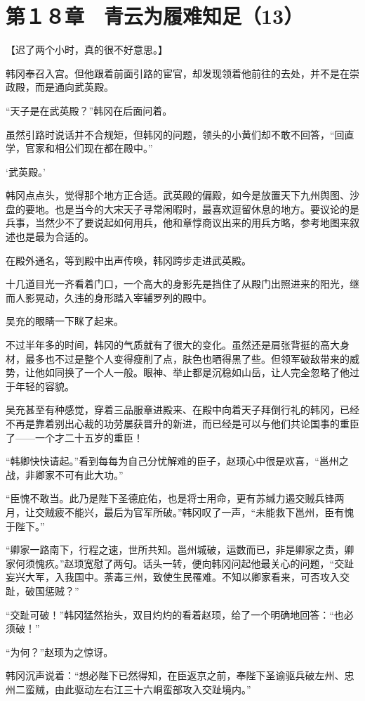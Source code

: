 \section{第１８章　青云为履难知足（13）}

【迟了两个小时，真的很不好意思。】

韩冈奉召入宫。但他跟着前面引路的宦官，却发现领着他前往的去处，并不是在崇政殿，而是通向武英殿。

“天子是在武英殿？”韩冈在后面问着。

虽然引路时说话并不合规矩，但韩冈的问题，领头的小黄们却不敢不回答，“回直学，官家和相公们现在都在殿中。”

‘武英殿。’

韩冈点点头，觉得那个地方正合适。武英殿的偏殿，如今是放置天下九州舆图、沙盘的要地。也是当今的大宋天子寻常闲暇时，最喜欢逗留休息的地方。要议论的是兵事，当然少不了要说起如何用兵，他和章惇商议出来的用兵方略，参考地图来叙述也是最为合适的。

在殿外通名，等到殿中出声传唤，韩冈跨步走进武英殿。

十几道目光一齐看着门口，一个高大的身影先是挡住了从殿门出照进来的阳光，继而人影晃动，久违的身形踏入宰辅罗列的殿中。

吴充的眼睛一下眯了起来。

不过半年多的时间，韩冈的气质就有了很大的变化。虽然还是肩张背挺的高大身材，最多也不过是整个人变得瘦削了点，肤色也晒得黑了些。但领军破敌带来的威势，让他如同换了一个人一般。眼神、举止都是沉稳如山岳，让人完全忽略了他过于年轻的容貌。

吴充甚至有种感觉，穿着三品服章进殿来、在殿中向着天子拜倒行礼的韩冈，已经不再是靠着别出心裁的功劳屡获晋升的新进，而已经是可以与他们共论国事的重臣了——一个才二十五岁的重臣！

“韩卿快快请起。”看到每每为自己分忧解难的臣子，赵顼心中很是欢喜，“邕州之战，非卿家不可有此大功。”

“臣愧不敢当。此乃是陛下圣德庇佑，也是将士用命，更有苏缄力遏交贼兵锋两月，让交贼疲不能兴，最后为官军所破。”韩冈叹了一声，“未能救下邕州，臣有愧于陛下。”

“卿家一路南下，行程之速，世所共知。邕州城破，运数而已，非是卿家之责，卿家何须愧疚。”赵顼宽慰了两句。话头一转，便向韩冈问起他最关心的问题，“交趾妄兴大军，入我国中。荼毒三州，致使生民罹难。不知以卿家看来，可否攻入交趾，破国惩贼？”

“交趾可破！”韩冈猛然抬头，双目灼灼的看着赵顼，给了一个明确地回答：“也必须破！”

“为何？”赵顼为之惊讶。

韩冈沉声说着：“想必陛下已然得知，在臣返京之前，奉陛下圣谕驱兵破左州、忠州二蛮贼，由此驱动左右江三十六峒蛮部攻入交趾境内。”

